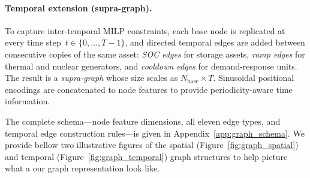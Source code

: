 \documentclass{article}
\begin{document}
\paragraph{Temporal extension (supra-graph).}
To capture inter-temporal MILP constraints, each base node is replicated at every time step~$t \in \{0,\dots,T{-}1\}$, and directed temporal edges are added between consecutive copies of the same asset: \emph{SOC edges} for storage assets, \emph{ramp edges} for thermal and nuclear generators, and \emph{cooldown edges} for demand-response units. The result is a \emph{supra-graph} whose size scales as $N_{\mathrm{base}} \times T$. Sinusoidal positional encodings are concatenated to node features to provide periodicity-aware time information.

The complete schema---node feature dimensions, all eleven edge types, and temporal edge construction rules---is given in Appendix~\ref{app:graph_schema}. We provide bellow two illustrative figures of the spatial (Figure~\ref{fig:graph_spatial})  and temporal (Figure~\ref{fig:graph_temporal}) graph structures to help picture what a our graph representation look like.
\end{document}

